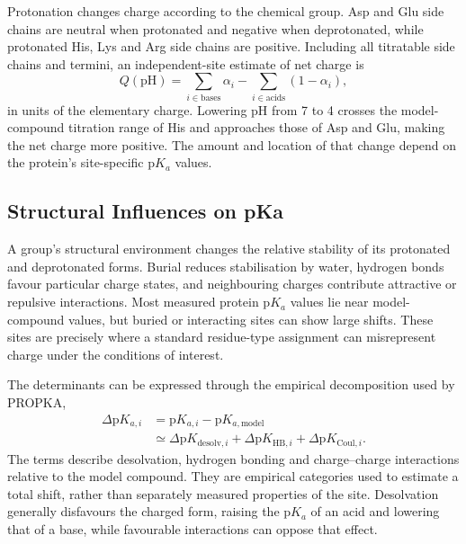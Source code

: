 Protonation changes charge according to the chemical group. Asp and Glu side chains are neutral when protonated and negative when deprotonated, while protonated His, Lys and Arg side chains are positive. Including all titratable side chains and termini, an independent-site estimate of net charge is
\begin{equation}
    Q(\mathrm{pH})=
    \sum_{i\in\text{bases}}\alpha_i
    -\sum_{i\in\text{acids}}(1-\alpha_i),
    \label{eq:bg-net-charge}
\end{equation}
in units of the elementary charge.\supercite{paceProteinIonizableGroups2009} Lowering pH from 7 to 4 crosses the model-compound titration range of His and approaches those of Asp and Glu, making the net charge more positive. The amount and location of that change depend on the protein's site-specific $\mathrm{p}K_a$ values.

\subsection{Structural Influences on pKa}
\label{sec:bg-pka-shifts}

A group's structural environment changes the relative stability of its protonated and deprotonated forms. Burial reduces stabilisation by water, hydrogen bonds favour particular charge states, and neighbouring charges contribute attractive or repulsive interactions. Most measured protein $\mathrm{p}K_a$ values lie near model-compound values, but buried or interacting sites can show large shifts.\supercite{grimsleySummaryMeasuredPK2009} These sites are precisely where a standard residue-type assignment can misrepresent charge under the conditions of interest.

The determinants can be expressed through the empirical decomposition used by PROPKA,
\begin{equation}
    \begin{split}
    \Delta\mathrm{p}K_{a,i}
    &=\mathrm{p}K_{a,i}-\mathrm{p}K_{a,\text{model}}\\
    &\simeq\Delta\mathrm{p}K_{\text{desolv},i}
    +\Delta\mathrm{p}K_{\text{HB},i}
    +\Delta\mathrm{p}K_{\text{Coul},i}.
    \end{split}
    \label{eq:bg-pka-shift}
\end{equation}
The terms describe desolvation, hydrogen bonding and charge--charge interactions relative to the model compound.\supercite{liVeryFastEmpirical2005,olssonPROPKA3ConsistentTreatment2011} They are empirical categories used to estimate a total shift, rather than separately measured properties of the site. Desolvation generally disfavours the charged form, raising the $\mathrm{p}K_a$ of an acid and lowering that of a base, while favourable interactions can oppose that effect.\supercite{grimsleySummaryMeasuredPK2009}

